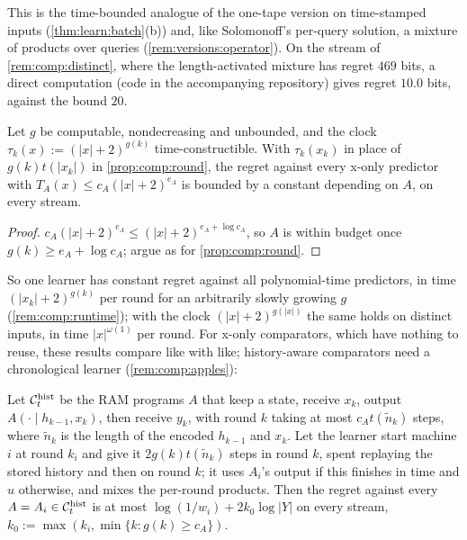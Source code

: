 This is the time-bounded analogue of the one-tape version on time-stamped inputs (\cref{thm:learn:batch}(b)) and, like Solomonoff's per-query solution, a mixture of products over queries (\cref{rem:versions:operator}). On the stream of \cref{rem:comp:distinct}, where the length-activated mixture has regret $469$ bits, a direct computation (code in the accompanying repository) gives regret $10.0$ bits, against the bound $20$.

\begin{corollary}\label{cor:comp:poly}
Let $g$ be computable, nondecreasing and unbounded, and the clock $\tau_k(x):=(|x|+2)^{g(k)}$ time-constructible. With $\tau_k(x_k)$ in place of $g(k)t(|x_k|)$ in \cref{prop:comp:round}, the regret against every x-only predictor with $T_A(x)\le c_A(|x|+2)^{e_A}$ is bounded by a constant depending on $A$, on every stream.
\end{corollary}

\begin{proof}
$c_A(|x|+2)^{e_A}\le(|x|+2)^{e_A+\log c_A}$, so $A$ is within budget once $g(k)\ge e_A+\log c_A$; argue as for \cref{prop:comp:round}.
\end{proof}

So one learner has constant regret against all polynomial-time predictors, in time $(|x_k|+2)^{g(k)}$ per round for an arbitrarily slowly growing $g$ (\cref{rem:comp:runtime}); with the clock $(|x|+2)^{g(|x|)}$ the same holds on distinct inputs, in time $|x|^{\omega(1)}$ per round. For x-only comparators, which have nothing to reuse, these results compare like with like; history-aware comparators need a chronological learner (\cref{rem:comp:apples}):

\begin{proposition}\label{prop:comp:history}
Let $\mathcal C^{\rm hist}_t$ be the RAM programs $A$ that keep a state, receive $x_k$, output $A(\cdot\mid h_{k-1},x_k)$, then receive $y_k$, with round $k$ taking at most $c_At(\tilde n_k)$ steps, where $\tilde n_k$ is the length of the encoded $h_{k-1}$ and $x_k$. Let the learner start machine $i$ at round $k_i$ and give it $2g(k)t(\tilde n_k)$ steps in round $k$, spent replaying the stored history and then on round $k$; it uses $A_i$'s output if this finishes in time and $u$ otherwise, and mixes the per-round products. Then the regret against every $A=A_i\in\mathcal C^{\rm hist}_t$ is at most $\log(1/w_i)+2k_0\log|Y|$ on every stream, $k_0:=\max(k_i,\min\{k:g(k)\ge c_A\})$.
\end{proposition}

